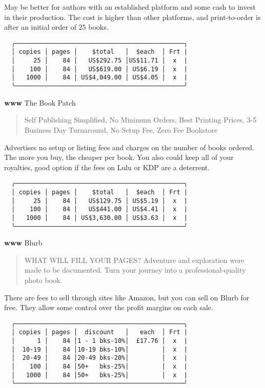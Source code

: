 \documentclass[
]{article}
\begin{document}
May be better for authors with an established platform and some cash to
invest in their production. The cost is higher than other platforms, and
print-to-order is after an initial order of 25 books.

\begin{verbatim}
  ╭──────────────────────────────────────────────╮ 
  │ copies │ pages │    $total   │  $each  │ Frt | 
  │     25 │    84 │   US$292.75 │US$11.71 │  x  | 
  │    100 │    84 │   US$619.00 │ US$6.19 │  x  | 
  │   1000 │    84 │ US$4,049.00 │ US$4.05 │  x  | 
  ╰──────────────────────────────────────────────╯ 
\end{verbatim}

\textbf{www} The Book Patch

\begin{quote}
Self Publishing Simplified, No Minimum Orders, Best Printing Prices, 3-5
Business Day Turnaround, No Setup Fee, Zero Fee Bookstore
\end{quote}

Advertises no setup or listing fees and charges on the number of books
ordered. The more you buy, the cheaper per book. You also could keep all
of your royalties, good option if the fees on Lulu or KDP are a
deterrent.

\begin{verbatim}
  ╭──────────────────────────────────────────────╮ 
  │ copies │ pages │    $total   │  $each  │ Frt | 
  │     25 │    84 │   US$129.75 │ US$5.19 │  x  | 
  │    100 │    84 │   US$441.00 │ US$4.41 │  x  | 
  │   1000 │    84 │ US$3,630.00 │ US$3.63 │  x  | 
  ╰──────────────────────────────────────────────╯ 
\end{verbatim}

\textbf{www} Blurb

\begin{quote}
WHAT WILL FILL YOUR PAGES? Adventure and exploration were made to be
documented. Turn your journey into a professional-quality photo book.
\end{quote}

There are fees to sell through sites like Amazon, but you can sell on
Blurb for free. They allow some control over the profit margins on each
sale.

\begin{verbatim}
  ╭──────────────────────────────────────────────╮ 
  │ copies │ pages │  discount   │   each  │ Frt | 
  │      1 │    84 │1 - 1 bks-10%│  £17.76 │  x  | 
  │  10-19 │    84 │10-19 bks-10%│         │  x  |
  │  20-49 │    84 │20-49 bks-20%│         │  x  |
  │    100 │    84 │50+   bks-25%│         │  x  | 
  │   1000 │    84 │50+   bks-25%│         │  x  | 
  ╰──────────────────────────────────────────────╯ 
\end{verbatim}
\end{document}
